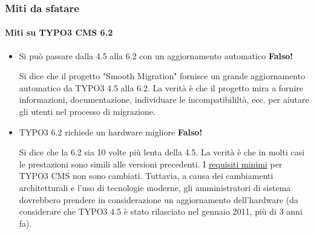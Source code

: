 \begin{frame}[fragile]
	\frametitle{Miti da sfatare}
	\framesubtitle{Miti su TYPO3 CMS 6.2}

	\begin{itemize}
		\item Si può passare dalla 4.5 alla 6.2 con un aggiornamento automatico
			\tabto{9cm}\color{red}\textbf{\textrightarrow Falso!}\color{black}

			\smaller
				Si dice che il progetto "Smooth Migration" fornisce un grande aggiornamento automatico da TYPO3 4.5 alla 6.2. La verità è che il progetto mira a fornire informazioni, documentazione, individuare le incompatibililtà, ecc. per aiutare gli utenti nel processo di migrazione.
			\normalsize

		\item TYPO3 6.2 richiede un hardware migliore
			\tabto{9cm}\color{red}\textbf{\textrightarrow Falso!}\color{black}

			\smaller
				Si dice che la 6.2 sia 10 volte più lenta della 4.5. La verità è che in molti casi le prestazioni sono simili alle versioni precedenti. I \href{http://typo3.org/about/typo3-the-cms/system-requirements/}{requisiti minimi} per TYPO3 CMS non sono cambiati. Tuttavia, a causa dei cambiamenti architetturali e l'uso di tecnologie moderne, gli amministratori di sistema dovrebbero prendere in considerazione un aggiornamento dell'hardware (da considerare che TYPO3 4.5 è stato rilasciato nel gennaio 2011, più di 3 anni fa).
			\normalsize

	\end{itemize}

\end{frame}


